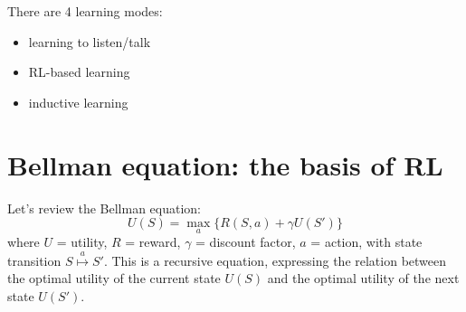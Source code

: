 \documentclass[12pt]{article}
\begin{document}

There are 4 learning modes:
\begin{itemize}
\item learning to listen/talk
\item RL-based learning
\item inductive learning
\end{itemize}

\section{Bellman equation: the basis of RL}

Let's review the Bellman equation:
\begin{equation}
 U(S) = \max_a \{ R(S,a) + \gamma U(S') \}
\end{equation}
where $U$ = utility, $R$ = reward, $\gamma$ = discount factor, $a$ = action, with state transition $S \stackrel{a}{\mapsto} S'$.  This is a recursive equation, expressing the relation between the optimal utility of the current state $U(S)$ and the optimal utility of the next state $U(S')$.
\end{document}
